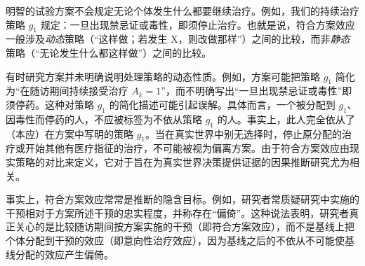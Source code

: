 明智的试验方案不会规定无论个体发生什么都要继续治疗。例如，我们的持续治疗策略 $g_1$ 规定：一旦出现禁忌证或毒性，即须停止治疗。也就是说，符合方案效应一般涉及\emph{动态}策略（“这样做；若发生 X，则改做那样”）之间的比较，而非\emph{静态}策略（“无论发生什么都这样做”）之间的比较。

有时研究方案并未明确说明处理策略的动态性质。例如，方案可能把策略 $g_1$ 简化为“在随访期间持续接受治疗 $A_k=1$”，而不明确写出“一旦出现禁忌证或毒性”即须停药。这种对策略 $g_1$ 的简化描述可能引起误解。具体而言，一个被分配到 $g_1$、因毒性而停药的人，不应被标签为不依从策略 $g_1$ 的人。事实上，此人完全依从了（本应）在方案中写明的策略 $g_1$。当在真实世界中别无选择时，停止原分配的治疗或开始其他有医疗指征的治疗，不可能被视为偏离方案。由于符合方案效应由现实策略的对比来定义，它对于旨在为真实世界决策提供证据的因果推断研究尤为相关。

事实上，符合方案效应常常是推断的隐含目标。例如，研究者常质疑研究中实施的干预相对于方案所述干预的忠实程度，并称存在“偏倚”。这种说法表明，研究者真正关心的是比较随访期间按方案实施的干预（即符合方案效应），而不是基线上把个体分配到干预的效应（即意向性治疗效应），因为基线之后的不依从不可能使基线分配的效应产生偏倚。

